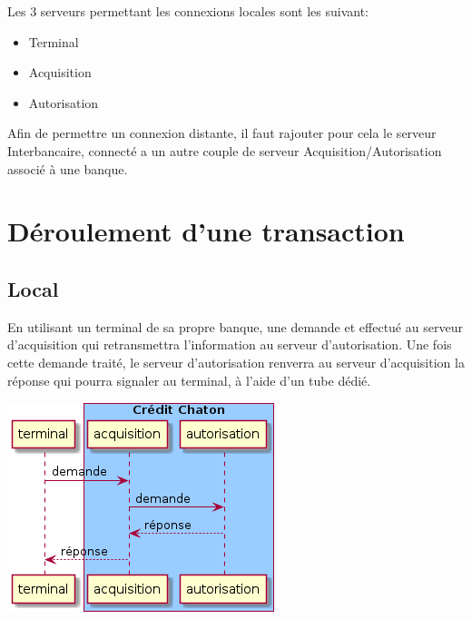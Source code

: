 \documentclass[french, a4paper, 12pt, titlepage]{article}
\begin{document}
Les 3 serveurs permettant les connexions locales sont les suivant:

\begin{itemize}
\item Terminal
\item Acquisition
\item Autorisation
\end{itemize}

Afin de permettre un connexion distante, il faut rajouter pour cela le serveur Interbancaire, connecté a un autre couple de serveur Acquisition/Autorisation associé à une banque.

\section{Déroulement d'une transaction}
\subsection{Local}
En utilisant un terminal de sa propre banque, une demande et effectué au serveur d'acquisition qui retransmettra l'information au serveur d'autorisation.
Une fois cette demande traité, le serveur d'autorisation renverra au serveur d'acquisition la réponse qui pourra signaler au terminal, à l'aide d'un tube dédié.
\medskip
\begin{center}
\includegraphics[scale=0.7]{transactionLocal}
\end{center}
\medskip
\end{document}
